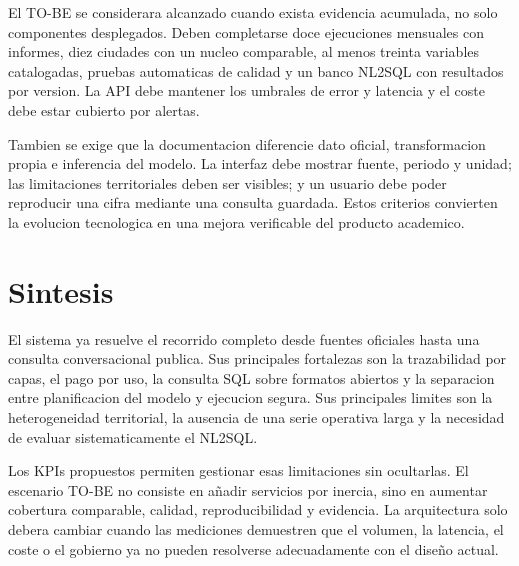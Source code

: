 El TO-BE se considerara alcanzado cuando exista evidencia acumulada, no solo componentes desplegados. Deben completarse doce ejecuciones mensuales con informes, diez ciudades con un nucleo comparable, al menos treinta variables catalogadas, pruebas automaticas de calidad y un banco NL2SQL con resultados por version. La API debe mantener los umbrales de error y latencia y el coste debe estar cubierto por alertas.

Tambien se exige que la documentacion diferencie dato oficial, transformacion propia e inferencia del modelo. La interfaz debe mostrar fuente, periodo y unidad; las limitaciones territoriales deben ser visibles; y un usuario debe poder reproducir una cifra mediante una consulta guardada. Estos criterios convierten la evolucion tecnologica en una mejora verificable del producto academico.

\section{Sintesis}

El sistema ya resuelve el recorrido completo desde fuentes oficiales hasta una consulta conversacional publica. Sus principales fortalezas son la trazabilidad por capas, el pago por uso, la consulta SQL sobre formatos abiertos y la separacion entre planificacion del modelo y ejecucion segura. Sus principales limites son la heterogeneidad territorial, la ausencia de una serie operativa larga y la necesidad de evaluar sistematicamente el NL2SQL.

Los KPIs propuestos permiten gestionar esas limitaciones sin ocultarlas. El escenario TO-BE no consiste en añadir servicios por inercia, sino en aumentar cobertura comparable, calidad, reproducibilidad y evidencia. La arquitectura solo debera cambiar cuando las mediciones demuestren que el volumen, la latencia, el coste o el gobierno ya no pueden resolverse adecuadamente con el diseño actual.
